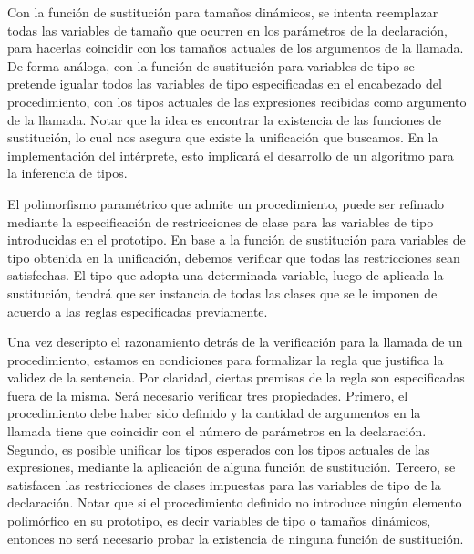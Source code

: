 Con la función de sustitución para tamaños dinámicos, se intenta reemplazar todas las variables de tamaño que ocurren en los parámetros de la declaración, para hacerlas coincidir con los tamaños actuales de los argumentos de la llamada.
De forma análoga, con la función de sustitución para variables de tipo se pretende igualar todos las variables de tipo especificadas en el encabezado del procedimiento, con los tipos actuales de las expresiones recibidas como argumento de la llamada.
Notar que la idea es encontrar la existencia de las funciones de sustitución, lo cual nos asegura que existe la unificación que buscamos.
En la implementación del intérprete, esto implicará el desarrollo de un algoritmo para la inferencia de tipos.

El polimorfismo paramétrico que admite un procedimiento, puede ser refinado mediante la especificación de restricciones de clase para las variables de tipo introducidas en el prototipo.
En base a la función de sustitución para variables de tipo obtenida en la unificación, debemos verificar que todas las restricciones sean satisfechas.
El tipo que adopta una determinada variable, luego de aplicada la sustitución, tendrá que ser instancia de todas las clases que se le imponen de acuerdo a las reglas especificadas previamente.

Una vez descripto el razonamiento detrás de la verificación para la llamada de un procedimiento, estamos en condiciones para formalizar la regla que justifica la validez de la sentencia.
Por claridad, ciertas premisas de la regla son especificadas fuera de la misma.
Será necesario verificar tres propiedades.
Primero, el procedimiento debe haber sido definido y la cantidad de argumentos en la llamada tiene que coincidir con el número de parámetros en la declaración.
Segundo, es posible unificar los tipos esperados con los tipos actuales de las expresiones, mediante la aplicación de alguna función de sustitución.
Tercero, se satisfacen las restricciones de clases impuestas para las variables de tipo de la declaración.
Notar que si el procedimiento definido no introduce ningún elemento polimórfico en su prototipo, es decir variables de tipo o tamaños dinámicos, entonces no será necesario probar la existencia de ninguna función de sustitución.

